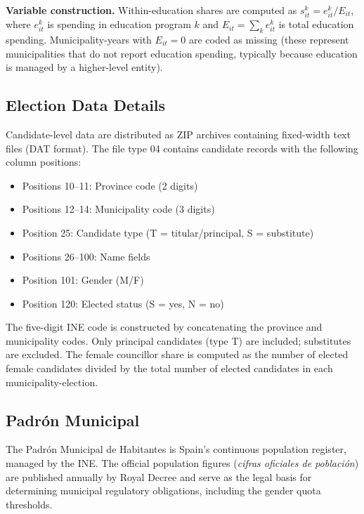 \documentclass[12pt]{article}
\begin{document}
\textbf{Variable construction.} Within-education shares are computed as $s_{it}^k = e_{it}^k / E_{it}$, where $e_{it}^k$ is spending in education program $k$ and $E_{it} = \sum_k e_{it}^k$ is total education spending. Municipality-years with $E_{it} = 0$ are coded as missing (these represent municipalities that do not report education spending, typically because education is managed by a higher-level entity).

\subsection{Election Data Details}

Candidate-level data are distributed as ZIP archives containing fixed-width text files (DAT format). The file type 04 contains candidate records with the following column positions:

\begin{itemize}
    \item Positions 10--11: Province code (2 digits)
    \item Positions 12--14: Municipality code (3 digits)
    \item Position 25: Candidate type (T = titular/principal, S = substitute)
    \item Positions 26--100: Name fields
    \item Position 101: Gender (M/F)
    \item Position 120: Elected status (S = yes, N = no)
\end{itemize}

The five-digit INE code is constructed by concatenating the province and municipality codes. Only principal candidates (type T) are included; substitutes are excluded. The female councillor share is computed as the number of elected female candidates divided by the total number of elected candidates in each municipality-election.

\subsection{Padr\'{o}n Municipal}

The Padr\'{o}n Municipal de Habitantes is Spain's continuous population register, managed by the INE. The official population figures (\emph{cifras oficiales de poblaci\'{o}n}) are published annually by Royal Decree and serve as the legal basis for determining municipal regulatory obligations, including the gender quota thresholds.
\end{document}
